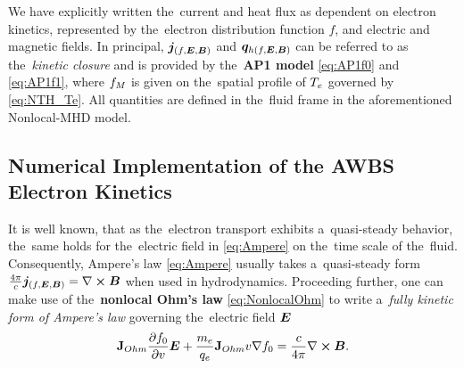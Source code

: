 We have explicitly written the~current and heat flux as dependent on
electron kinetics, represented by the~electron distribution function $f$,
and electric and magnetic fields. In principal, $\boldsymbol{j}_{(f, \boldsymbol{E}, \boldsymbol{B})}$
and $\boldsymbol{q}_{h(f, \boldsymbol{E}, \boldsymbol{B})}$ can be referred to as the~\textit{kinetic closure}
and is provided by the~{\bf AP1 model} \eqref{eq:AP1f0} and \eqref{eq:AP1f1},
where $f_M$ is given on the~spatial profile of $T_e$ 
governed by \eqref{eq:NTH_Te}.
All quantities are defined in the~fluid frame in the aforementioned 
Nonlocal-MHD model.

\subsection{Numerical Implementation of the AWBS Electron Kinetics}
\label{sec:Numerics}

It is well known, that as the~electron transport exhibits a~quasi-steady
behavior, the~same holds for the~electric field in \eqref{eq:Ampere} on 
the~time scale of the~fluid. Consequently, Ampere's law \eqref{eq:Ampere} 
usually takes a~quasi-steady form 
$\frac{4\pi}{c} \boldsymbol{j}_{(f, \boldsymbol{E}, \boldsymbol{B})} = \nabla\boldsymbol{\times}\boldsymbol{B}$
when used in hydrodynamics. Proceeding further, one can make use of 
the~{\bf nonlocal Ohm's law} \eqref{eq:NonlocalOhm} to write 
a~\textit{fully kinetic form of Ampere's law} 
governing the~electric field $\boldsymbol{E}$
\begin{equation}
  \mathbf{J}_{Ohm}\frac{\partial{f_0}}{\partial{v}}\boldsymbol{E} 
  + \frac{m_e}{q_e} \mathbf{J}_{Ohm}v \nabla f_0 = 
  \frac{c}{4\pi} \nabla\boldsymbol{\times}\boldsymbol{B} 
  .
  \label{eq:AmpereKinetic}
\end{equation}

